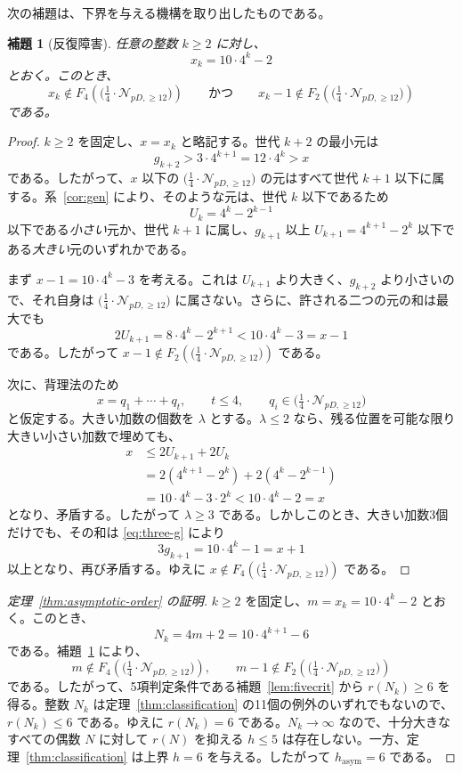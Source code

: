 \documentclass[12pt]{ltjsarticle}
\theoremstyle{plain}
\newtheorem{lemma}[theorem]{補題}
\theoremstyle{definition}
\theoremstyle{plain}
\newcommand{\Pset}{
  \bigl(\tfrac{1}{4}\cdot\mathcal{N}_{pD,\geq 12}\bigr)
}
\begin{document}
次の補題は、下界を与える機構を取り出したものである。

\begin{lemma}[反復障害]\label{lem:obstruction}
任意の整数 $k\geq2$ に対し、
\[
  x_k=10\cdot4^k-2
\]
とおく。このとき、
\begin{equation}\label{eq:obstruction}
  x_k\notin F_4(\Pset)
  \qquad\text{かつ}\qquad
  x_k-1\notin F_2(\Pset)
\end{equation}
である。
\end{lemma}

\begin{proof}
$k\geq2$ を固定し、$x=x_k$ と略記する。世代 $k+2$ の最小元は
\[
  g_{k+2}>3\cdot4^{k+1}=12\cdot4^k>x
\]
である。したがって、$x$ 以下の $\Pset$ の元はすべて世代 $k+1$ 以下に属する。系~\ref{cor:gen} により、そのような元は、世代 $k$ 以下であるため
\[
  U_k=4^k-2^{k-1}
\]
以下である\emph{小さい}元か、世代 $k+1$ に属し、$g_{k+1}$ 以上 $U_{k+1}=4^{k+1}-2^k$ 以下である\emph{大きい}元のいずれかである。

まず $x-1=10\cdot4^k-3$ を考える。これは $U_{k+1}$ より大きく、$g_{k+2}$ より小さいので、それ自身は $\Pset$ に属さない。さらに、許される二つの元の和は最大でも
\[
  2U_{k+1}=8\cdot4^k-2^{k+1}<10\cdot4^k-3=x-1
\]
である。したがって $x-1\notin F_2(\Pset)$ である。

次に、背理法のため
\[
  x=q_1+\cdots+q_t,\qquad t\leq4,\qquad q_i\in\Pset
\]
と仮定する。大きい加数の個数を $\lambda$ とする。$\lambda\leq2$ なら、残る位置を可能な限り大きい小さい加数で埋めても、
\begin{align*}
  x
  &\leq2U_{k+1}+2U_k\\
  &=2(4^{k+1}-2^k)+2(4^k-2^{k-1})\\
  &=10\cdot4^k-3\cdot2^k
  <10\cdot4^k-2=x
\end{align*}
となり、矛盾する。したがって $\lambda\geq3$ である。しかしこのとき、大きい加数3個だけでも、その和は \eqref{eq:three-g} により
\[
  3g_{k+1}=10\cdot4^k-1=x+1
\]
以上となり、再び矛盾する。ゆえに $x\notin F_4(\Pset)$ である。
\end{proof}

\begin{proof}[定理~\ref{thm:asymptotic-order} の証明]
$k\geq2$ を固定し、$m=x_k=10\cdot4^k-2$ とおく。このとき、
\[
  N_k=4m+2=10\cdot4^{k+1}-6
\]
である。補題~\ref{lem:obstruction} により、
\[
  m\notin F_4(\Pset),\qquad m-1\notin F_2(\Pset)
\]
である。したがって、5項判定条件である補題~\ref{lem:fivecrit} から $r(N_k)\geq6$ を得る。整数 $N_k$ は定理~\ref{thm:classification} の11個の例外のいずれでもないので、$r(N_k)\leq6$ である。ゆえに $r(N_k)=6$ である。$N_k\to\infty$ なので、十分大きなすべての偶数 $N$ に対して $r(N)$ を抑える $h\leq5$ は存在しない。一方、定理~\ref{thm:classification} は上界 $h=6$ を与える。したがって $h_{\mathrm{asym}}=6$ である。
\end{proof}
\end{document}
